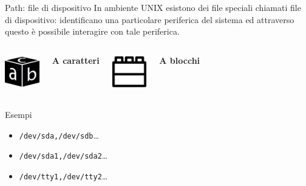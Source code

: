 \documentclass{beamer}
\begin{document}
    \begin{frame}{Path: file di dispositivo}
        In ambiente UNIX esistono dei file speciali chiamati file di dispositivo:
        identificano una particolare periferica del sistema ed attraverso questo è possibile interagire con tale periferica. \\
        \vspace{0.25cm}
        \begin{columns}[t, onlytextwidth]
                \centering
                \includegraphics[height=1.5cm, keepaspectratio]{images/char.pdf}
                
                \textbf{A caratteri}

                \centering
                \includegraphics[height=1.5cm, keepaspectratio]{images/block.pdf}
                
                \textbf{A blocchi}
        \end{columns}

        \vspace{0.25cm}

        \begin{exampleblock}{Esempi}
            \begin{itemize}
                \item \texttt{/dev/sda,/dev/sdb}\dots
                \item \texttt{/dev/sda1,/dev/sda2}\dots
                \item \texttt{/dev/tty1,/dev/tty2}\dots
            \end{itemize}
        \end{exampleblock}
    \end{frame}
\end{document}
